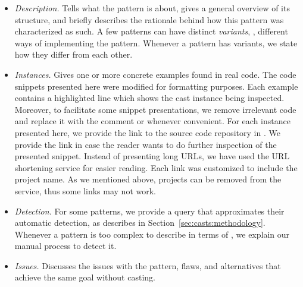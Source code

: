 \begin{itemize}

\item\textit{Description.}
Tells what the pattern is about, gives a general overview of its structure, and
briefly describes the rationale behind how this pattern was characterized as such.
A few patterns can have distinct \emph{variants}, \ie,
different ways of implementing the pattern.
Whenever a pattern has variants,
we state how they differ from each other.

\item\textit{Instances.}
Gives one or more concrete examples found in real code.
The code snippets presented here were modified for formatting purposes.
Each example contains a highlighted line which shows the cast instance being inspected.
Moreover, to facilitate some snippet presentations,
we remove irrelevant code and replace it with the comment
\code{// [...]} or \code{/* [...] */} whenever convenient.
For each instance presented here,
we provide the link to the source code repository in \lgtm{}.
We provide the link in case the reader wants to do further inspection of the presented snippet.
Instead of presenting long \lgtm{} URLs,
we have used the URL shortening service
\href{https://bitly.com/}{\bitly} for easier reading.
Each \bitly{} link was customized to include the project name.
As we mentioned above, projects can be removed from the \lgtm{} service,
thus some links may not work.

\item\textit{Detection.}
For some patterns,
we provide a \ql{} query that approximates their automatic detection,
as describes in Section~\ref{sec:casts:methodology}.
Whenever a pattern is too complex to describe in terms of \ql{},
we explain our manual process to detect it.

\item\textit{Issues.}
Discusses the issues with the pattern, flaws, and alternatives that achieve the same goal without casting.

\end{itemize}


\newcommand\castpatternsection[1]{\paragraph{#1.}}
\newcommand\variant[1]{\textsl{#1}}
\newenvironment{pattern}[1]{
\newcommand{\nocc}{\csname n#1Pattern\endcsname{}}
\newcommand{\noccsrc}{\csname n#1PatternSrc\endcsname{}}
\newcommand{\noccgen}{\csname n#1PatternGen\endcsname{}}
\newcommand{\nocctest}{\csname n#1PatternTest\endcsname{}}
\newcommand{\pocc}{\csname p#1Pattern\endcsname{}}
\newcommand{\instances}{\castpatternsection{Instances: \nocc{} (\pocc\%)}
    We found \noccsrc{} in application code,
    \nocctest{} in test code,
    and \noccgen{} in generated code.}
\newcommand{\detection}{\castpatternsection{Detection}}
\newcommand{\issues}{\castpatternsection{Issues}}
\newcommand{\thisp}{\textsc{#1}}
\subsection{\textsc{#1}}
\label{pat:#1}
\castpatternsection{Description}
}{}

